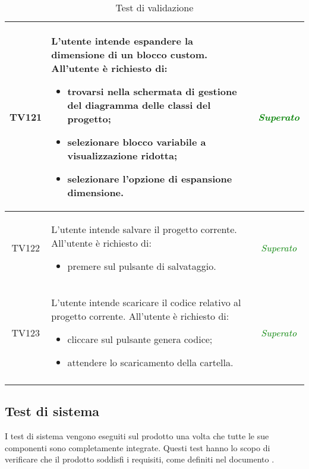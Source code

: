 \begin{longtable}{|c|>{}m{8cm}|c|}
\hypertarget{TV4.39}{TV121} & L'utente intende espandere la dimensione di un blocco custom.
All'utente è richiesto di:
\begin{itemize}
	\item trovarsi nella schermata di gestione del diagramma delle classi del progetto;
	\item selezionare blocco variabile a visualizzazione ridotta;
	\item selezionare l'opzione di espansione dimensione.
\end{itemize} & \textcolor{Green}{\textit{Superato}}\\ \hline

\hypertarget{TV5}{TV122} & L'utente intende salvare il progetto corrente.
All'utente è richiesto di:
\begin{itemize}
	\item premere sul pulsante di salvataggio.
\end{itemize} & \textcolor{Green}{\textit{Superato}}\\ \hline

\hypertarget{TV6}{TV123} & L'utente intende scaricare il codice relativo al progetto corrente.
All'utente è richiesto di:
\begin{itemize}
	\item cliccare sul pulsante genera codice;
	\item attendere lo scaricamento della cartella.
\end{itemize} & \textcolor{Green}{\textit{Superato}}\\ \hline
\caption[Test di validazione]{Test di validazione}
\label{tab:valid}
\end{longtable}
\clearpage


\subsection{Test di sistema}
I test di sistema vengono eseguiti sul prodotto una volta che tutte le sue componenti sono completamente integrate. Questi test hanno lo scopo di verificare che il prodotto soddisfi i requisiti, come definiti nel documento \AdR.

